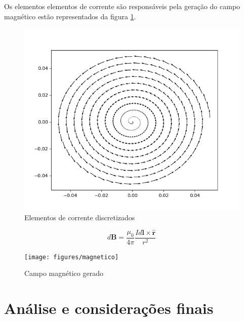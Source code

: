 \documentclass[
	article,			%
	11pt,				%
	oneside,			%
	a4paper,			%
	english,			%
	brazil,				%
	sumario=tradicional
	]{abntex2}
\begin{document}
Os elementos elementos de corrente são responsáveis pela geração do campo magnético estão representados da figura \ref{fig:elementosdecondutor}.

\begin{figure}[h]
	\centering
	\includegraphics[width=0.7\linewidth]{figures/elementosdecondutor}
	\caption[Elementos de corrente discretizados]{Elementos de corrente discretizados}
	\label{fig:elementosdecondutor}
\end{figure}


\begin{equation} \label{eq:biot-savart}
	d\textbf{B} = \frac{\mu_0}{4\pi} \frac{Id\textbf{l} \times \hat{\textbf{r}}}{r^2}
\end{equation}

\begin{figure}[h]
	\centering
	\texttt{[image: figures/magnetico]}
	\caption[Campo magnético gerado]{Campo magnético gerado}
	\label{fig:magnetico}
\end{figure}


\section{Análise e considerações finais}




\end{document}
